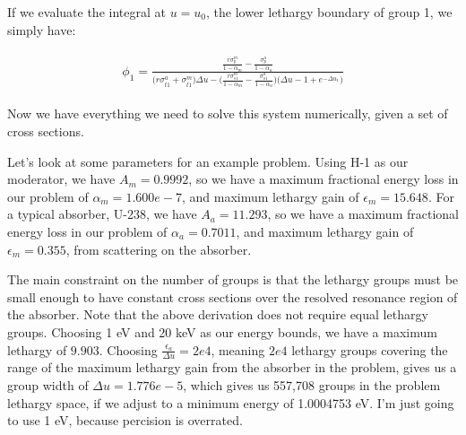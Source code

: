 \documentclass{article}
\begin{document}
        If we evaluate the integral at $u = u_0$, the lower lethargy boundary of group 1, we simply have:
        
        \begin{align}
        \begin{split}
            \label{eq:balance_group-1}
            \phi_1  =
            \frac{
            \frac{r \sigma_{p}^m }{1-\alpha_m} - \frac{\sigma_{p}^a }{1-\alpha_a} }
            {  
                \big( r \sigma_{t1}^a + \sigma_{t1}^m  \big) \Delta u - 
            \bigg( \frac{r \sigma_{s1}^m }{1-\alpha_m} - \frac{\sigma_{s1}^a }{1-\alpha_a}  \bigg)
            \bigg( \Delta u -1 + e^{-\Delta u_1} \bigg) 
            }
        \end{split}
        \end{align}

        Now we have everything we need to solve this system numerically, given a set of cross sections.


        Let's look at some parameters for an example problem.
        Using H-1 as our moderator, we have 
        $A_m = 0.9992$, so we have a
        maximum fractional energy loss in our problem of $\alpha_m = 1.600e-7$, and 
        maximum lethargy gain of $\epsilon_m = 15.648$. 
        For a typical absorber, U-238, we have 
        $A_a = 11.293$, so we have a
        maximum fractional energy loss in our problem of $\alpha_a =0.7011 $, and 
        maximum lethargy gain of $\epsilon_m = 0.355$, from scattering on the absorber. 
        
        
        The main constraint on the number of groups is that the lethargy groups must be small
        enough to have constant cross sections over the resolved resonance region of the absorber.
        Note that the above derivation does not require equal lethargy groups.
        Choosing 1 eV and 20 keV as our energy bounds, we have a maximum lethargy of $9.903$.
        Choosing $\frac{\epsilon_a}{\Delta u} = 2e4$, meaning $2e4$ lethargy groups 
        covering the range of the maximum lethargy gain from the absorber in the problem, 
        gives us a group width of $\Delta u = 1.776e-5$,
        which gives us 557,708 groups in the problem lethargy space, if we adjust to a 
        minimum energy of 1.0004753 eV. 
        I'm just going to use 1 eV, because percision is overrated.
    
\end{document}
